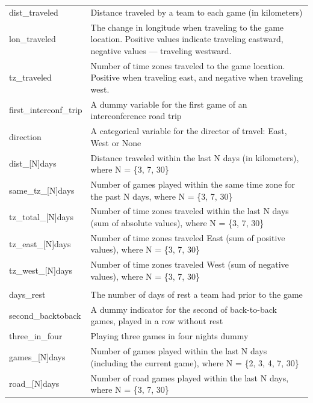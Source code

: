 \documentclass[
    12pt,
    a4paper,
    titlepage,  %
    abstract,  %
    headings=standardclasses,  %
    bibliography=totocnumbered  %
]{scrartcl}
\begin{document}
\begin{longtable}{|>{\ttfamily}l|L{4.17in}|}
     \\ \hline
    dist\_traveled & Distance traveled by a team to each game (in kilometers) \\ \hline
    lon\_traveled & The change in longitude when traveling to the game location. Positive values indicate traveling eastward, negative values — traveling westward. \\ \hline
    tz\_traveled & Number of time zones traveled to the game location. Positive when traveling east, and negative when traveling west. \\ \hline
    first\_interconf\_trip & A dummy variable for the first game of an interconference road trip \\ \hline
    direction & A categorical variable for the director of travel: East, West or None \\ \hline
    dist\_[N]days & Distance traveled within the last N days (in kilometers), where N = \{3, 7, 30\} \\ \hline
    same\_tz\_[N]days & Number of games played within the same time zone for the past N days, where N = \{3, 7, 30\} \\ \hline
    tz\_total\_[N]days & Number of time zones traveled within the last N days (sum of absolute values), where N = \{3, 7, 30\} \\ \hline
    tz\_east\_[N]days & Number of time zones traveled East (sum of positive values), where N = \{3, 7, 30\} \\ \hline
    tz\_west\_[N]days & Number of time zones traveled West (sum of negative values), where N = \{3, 7, 30\} \\ \hline
    
     \\ \hline
    days\_rest & The number of days of rest a team had prior to the game \\ \hline
    second\_backtoback & A dummy indicator for the second of back-to-back games, played in a row without rest \\ \hline
    three\_in\_four & Playing three games in four nights dummy \\ \hline
    games\_[N]days & Number of games played within the last N days (including the current game), where N = \{2, 3, 4, 7, 30\} \\ \hline
    road\_[N]days & Number of road games played within the last N days, where N = \{3, 7, 30\} \\ \hline
    

\end{longtable}
\end{document}
